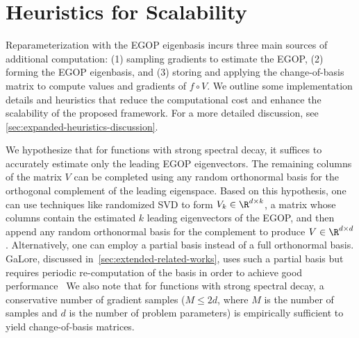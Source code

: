 \documentclass{article}
\begin{document}
\section{Heuristics for Scalability}\label{ssec:efficient-heuristics}

Reparameterization with the EGOP eigenbasis incurs three main sources of additional computation: (1) sampling gradients to estimate the EGOP, (2) forming the EGOP eigenbasis, and (3) storing and applying the change-of-basis matrix to compute values and gradients of $f\circ V$. We outline some implementation details and heuristics that reduce the computational cost and enhance the scalability of the proposed framework. For a more detailed discussion, see \cref{sec:expanded-heuristics-discussion}.

We hypothesize that for functions with strong spectral decay, it suffices to accurately estimate  only the leading EGOP eigenvectors. The remaining columns of the matrix $V$ can be completed using any random orthonormal basis for the orthogonal complement of the leading eigenspace. Based on this hypothesis, one can use techniques like randomized SVD \cite{halko2011finding} to form $V_k \in \R^{d\times k}$, a matrix whose columns contain the estimated $k$ leading eigenvectors of the EGOP, and then append any random orthonormal basis for the complement to produce $V\in \R^{d\times d}$. Alternatively, one can employ a partial basis instead of a full orthonormal basis. GaLore, discussed in~\cref{sec:extended-related-works}, uses such a partial basis but requires periodic re-computation of the basis in order to achieve good performance~\cite{zhao2024galore} We also note that for functions with strong spectral decay, a conservative number of gradient samples ($M \leq 2d$, where $M$ is the number of samples and $d$ is the number of problem parameters) is empirically sufficient to yield change-of-basis matrices.
\end{document}

